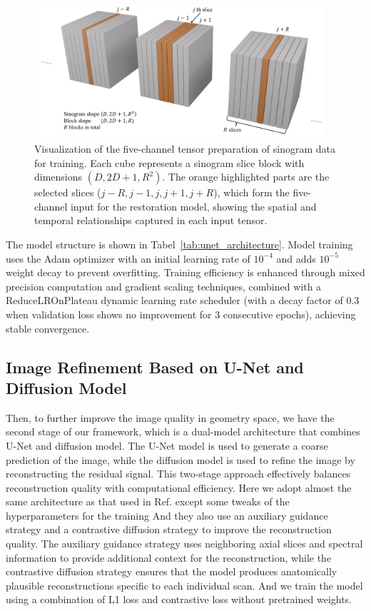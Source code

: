 \documentclass[aps,prb,preprint,groupedaddress,showkeys]{revtex4}
\begin{document}
\begin{figure}[htbp]
\centering
\vspace{-.3cm}
\includegraphics[width=0.96\textwidth]{Images/slices.pdf}
\vspace{-.3cm}
\caption{Visualization of the five-channel tensor preparation of sinogram data for training. Each cube represents a sinogram slice block with dimensions $(D, 2D+1, R^2)$. The orange highlighted parts are the selected slices ($j-R, j-1, j, j+1, j+R$), which form the five-channel input for the restoration model, showing the spatial and temporal relationships captured in each input tensor.}
\label{fig:sinogram_structure}
\end{figure}



The model structure is shown in Tabel~\ref{tab:unet_architecture}.
Model training uses the Adam optimizer with an initial learning rate of $10^{-4}$ and adds   $10^{-5}$ weight decay to prevent overfitting. 
Training efficiency is enhanced through mixed precision computation and gradient scaling techniques, combined with a ReduceLROnPlateau dynamic learning rate scheduler (with a decay factor of 0.3 when validation loss shows no improvement for 3 consecutive epochs), achieving stable convergence.


\subsection{Image Refinement Based on U-Net and Diffusion Model}
\label{sec:diffusion_model}
Then, to further improve the image quality in geometry space, we have the second stage of our framework, which is a dual-model architecture that combines U-Net and diffusion model. The U-Net model is used to generate a coarse prediction of the image, while the diffusion model is used to refine the image by reconstructing the residual signal. This two-stage approach effectively balances reconstruction quality with computational efficiency.
Here we adopt almost the same architecture as that used in Ref. \cite{han2023} except some tweaks of the hyperparameters for the training
And they also use an auxiliary guidance strategy and a contrastive diffusion strategy to improve the reconstruction quality. The auxiliary guidance strategy uses neighboring axial slices and spectral information to provide additional context for the reconstruction, while the contrastive diffusion strategy ensures that the model produces anatomically plausible reconstructions specific to each individual scan. 
And we train the model using a combination of L1 loss and contrastive loss without pretrained weights. 
\end{document}
